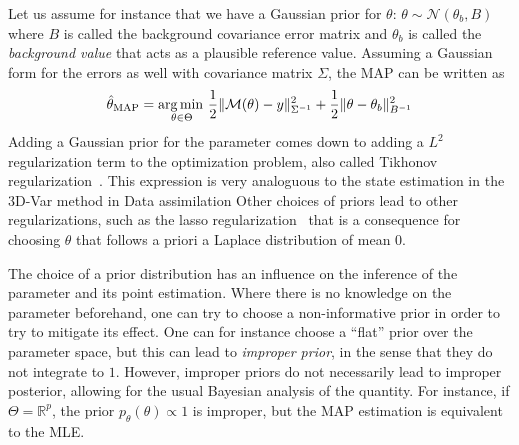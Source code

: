 \documentclass[../../Main_ManuscritThese.tex]{subfiles}
\begin{document}
Let us assume for instance that we have a Gaussian prior for $\theta$: $\theta \sim \mathcal{N}(\theta_{b},B)$ where $B$ is called the background covariance error matrix and $\theta_b$ is called the \emph{background value} that acts as a plausible reference value. Assuming a Gaussian form for the errors as well with covariance matrix $\Sigma$, the MAP can be written as
\begin{equation}
  \hat{\theta}_{\mathrm{MAP}} = \operatorname*{arg\,min \,}_{\theta \in \Theta} \frac{1}{2}\| \mathcal{M}(\theta) - y\|^2_{\Sigma^{-1}} + \frac{1}{2}\|\theta - \theta_b\|^2_{B^{-1}}
\end{equation}
Adding a Gaussian prior for the parameter comes down to adding a $L^2$ regularization term to the optimization problem, also called Tikhonov regularization~\cite{tikhonov_solutions_1977}. This expression is very analoguous to the state estimation in the 3D-Var method in Data assimilation 
Other choices of priors lead to other regularizations, such as the lasso regularization~\cite{tibshirani_regression_2011} that is a consequence for choosing $\theta$ that follows a priori a Laplace distribution of mean $0$.

The choice of a prior distribution has an influence on the inference of the parameter and its point estimation. Where there is no knowledge on the parameter beforehand, one can try to choose a non-informative prior in order to try to mitigate its effect. One can for instance choose a ``flat'' prior over the parameter space, but this can lead to \emph{improper prior}, in the sense that they do not integrate to $1$. However, improper priors do not necessarily lead to improper posterior, allowing for the usual Bayesian analysis of the quantity. For instance, if $\Theta=\mathbb{R}^p$, the prior $p_{\theta}(\theta) \propto 1$ is improper, but the MAP estimation is equivalent to the MLE.

\end{document}
